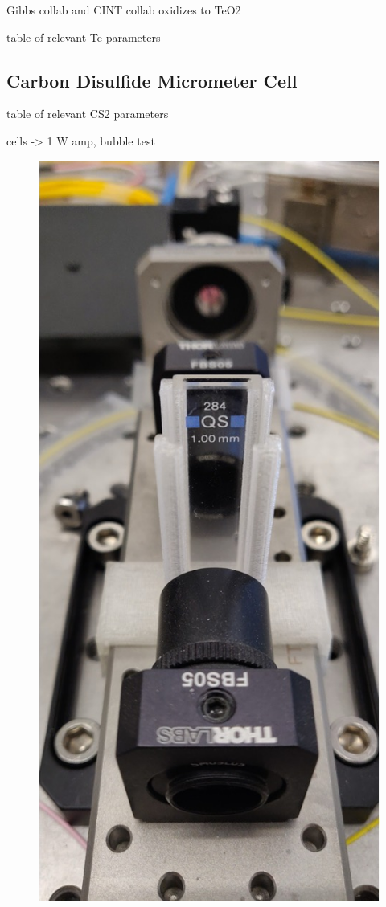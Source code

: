 Gibbs collab and CINT collab
oxidizes to TeO2

table of relevant Te parameters

\subsection{Carbon Disulfide Micrometer Cell}
\label{subsec:Raman:Target:CS2Cells}

table of relevant CS2 parameters

cells -> 1 W amp, bubble test

\begin{figure}[t]
  \centering
  \includegraphics[width=\textwidth]{figs/4-Raman/1mmCS2.jpg}

\end{figure}
